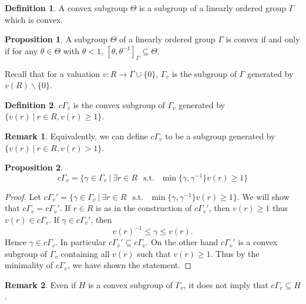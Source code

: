 \documentclass[10pt]{article}
\numberwithin{equation}{section}
\theoremstyle{definition}
\newtheorem{proposition}{Proposition}[subsection]
\newtheorem{definition}{Definition}[subsection]
\newtheorem{remark}{Remark}[subsection]
\DeclareMathOperator{\straw}{s.t.}
\newcommand{\sep}[0]{\:|\:}
\newcommand{\st}[0]{\:\straw\:}
\newcommand{\cGamma}[0]{c\Gamma}
\begin{document}
\begin{definition}
    A convex subgroup $\Theta$ is a subgroup of a linearly ordered group $\Gamma$ which is convex.
\end{definition}

\begin{proposition}
    \label{fact_6_8.5}
    A subgroup $\Theta$ of a linearly ordered group $\Gamma$ is convex if and only if for any $\theta\in \Theta$ with $\theta<1$, $[\theta,\theta^{-1}]_\Gamma\subseteq\Theta$.
\end{proposition}
Recall that for a valuation $v:R\to \Gamma\cup\{0\}$, $\Gamma_v$ is the subgroup of $\Gamma$ generated by $v(R)\backslash\{0\}$.
\begin{definition}
    \label{definition_6_9}
    $\cGamma_v$ is the convex subgroup of $\Gamma_v$ generated by $\{v(r)\sep r\in R, v(r)\geq1\}$.
\end{definition}
\begin{remark}
    Equivalently, we can define $\cGamma_v$ to be a subgroup generated by $\{v(r)\sep r\in R, v(r)>1\}$.
\end{remark}

\begin{proposition}
    \label{fact_6_10}
    \begin{equation*}
        \cGamma_v = \{\gamma\in\Gamma_v\sep \exists r\in R \:\st\: \min\{\gamma,\gamma^{-1}\} v(r)\geq1\}
    \end{equation*}
\end{proposition}
\begin{proof}
    Let $\cGamma_v' =  \{\gamma\in\Gamma_v\sep \exists r\in R \:\st\: \min\{\gamma,\gamma^{-1}\} v(r)\geq1\}$. We will show that $\cGamma_v=\cGamma_v'$.
    If $r\in R$ is as in the construction of $\cGamma_v'$, then $v(r)\geq1$ thus $v(r)\in\cGamma_v$. If $\gamma\in\cGamma_v'$, then
    \begin{equation*}
        v(r)^{-1}\leq \gamma\leq v(r).
    \end{equation*}
    Hence $\gamma\in\cGamma_v$. In particular $\cGamma_v'\subseteq\cGamma_v$. On the other hand $\cGamma_v'$ is a convex subgroup of $\Gamma_v$ containing all $v(r)$ such that $v(r)\geq1$. Thus by the minimality of $\cGamma_v$, we have shown the statement.
\end{proof}
\begin{remark}
    Even if $H$ is a convex subgroup of $\Gamma_v$, it does not imply that $\cGamma_v\subseteq H$.
\end{remark}
\end{document}
